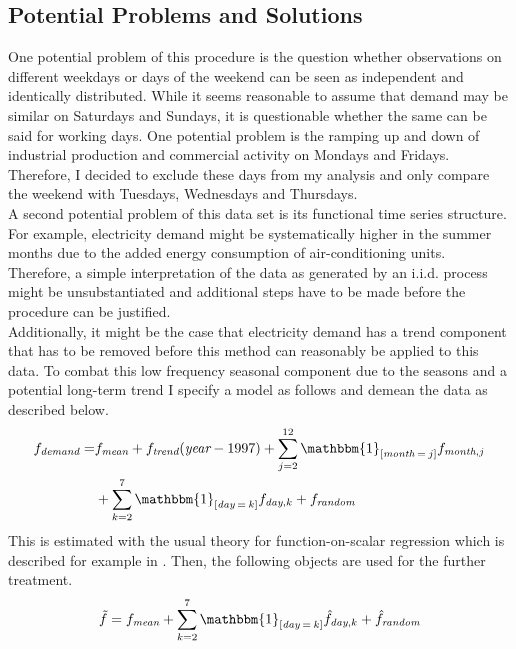 \documentclass[12pt, a4paper]{article}
\theoremstyle{MAstyle} \newtheorem{assumption}{Assumption}[section]
\theoremstyle{MAstyle} \newtheorem{definition}{Definition}[section]
\begin{document}
		\subsection{Potential Problems and Solutions}
			One potential problem of this procedure is the question whether observations on different weekdays or days of the weekend can be seen as independent and identically distributed. While it seems reasonable to assume that demand may be similar on Saturdays and Sundays, it is questionable whether the same can be said for working days. 
			One potential problem is the ramping up and down of industrial production and commercial activity on Mondays and Fridays. Therefore, I decided to exclude these days from my analysis and only compare the weekend with Tuesdays, Wednesdays and Thursdays.\\
			
			A second potential problem of this data set is its functional time series structure. For example, electricity demand might be systematically higher in the summer months due to the added energy consumption of air-conditioning units. Therefore, a simple interpretation of the data as generated by an i.i.d. process might be unsubstantiated and additional steps have to be made before the procedure can be justified. \\
			Additionally, it might be the case that electricity demand has a trend component that has to be removed before this method can reasonably be applied to this data. To combat this low frequency seasonal component due to the seasons and a potential long-term trend I specify a model as follows and demean the data as described below.
			\begin{equation}
				\begin{split}
					f_{\textit{demand}} = &f_{\textit{mean}} + f_{\textit{trend}}(\textit{year} - 1997) + \sum_{j = 2}^{12}\mathbbm{1}_{\left[\textit{month}\: = \: j\right]}f_{\textit{month}, j}\\
					 &+ \sum_{k = 2}^{7}\mathbbm{1}_{\left[\textit{day}\: = \: k\right]}f_{\textit{day}, k} + f_{\textit{random}}
				\end{split}	
			\end{equation}
			This is estimated with the usual theory for function-on-scalar regression which is described for example in \cite{ramsay_functional_2005}. Then, the following objects are used for the further treatment.
			\begin{equation}
				\tilde{f} = f_{\textit{mean}} + \sum_{k = 2}^{7}\mathbbm{1}_{\left[\textit{day}\: = \: k\right]}\hat{f}_{\textit{day}, k} + \hat{f}_{\textit{random}}
			\end{equation}
			
\end{document}
